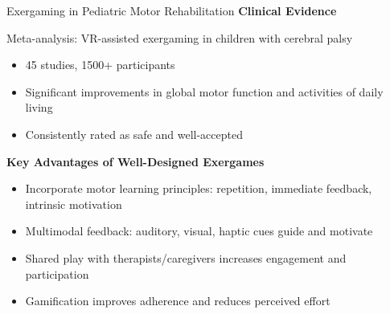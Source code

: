 \begin{frame}{Exergaming in Pediatric Motor Rehabilitation}
	\textbf{\textcolor{gbAqua}{Clinical Evidence}}
	
	Meta-analysis: VR-assisted exergaming in children with cerebral palsy
	
	\begin{itemize}
		\item 45 studies, 1500+ participants
		\item Significant improvements in global motor function and activities of daily living
		\item Consistently rated as safe and well-accepted
	\end{itemize}
	
	\vspace{0.3cm}
	
	\textbf{\textcolor{gbAqua}{Key Advantages of Well-Designed Exergames}}
	
	\begin{itemize}
		\item Incorporate motor learning principles: repetition, immediate feedback, intrinsic motivation
		\item Multimodal feedback: auditory, visual, haptic cues guide and motivate
		\item Shared play with therapists/caregivers increases engagement and participation
		\item Gamification improves adherence and reduces perceived effort
	\end{itemize}
	
\end{frame}

